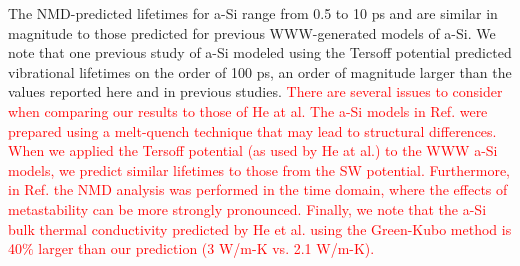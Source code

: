 \documentclass[aps,prb,twocolumn,superscriptaddress,footinbib,amsmath,amssymb,floatfix]{revtex4}
\begin{document}
The NMD-predicted lifetimes for a-Si range from 0.5 to 10 ps 
and are similar in magnitude to 
those predicted for previous WWW-generated models of a-Si.
\cite{fabian_anharmonic_1996,bickham_calculation_1998,
bickham_numerical_1999,fabian_numerical_2003}  
We note that one previous study of a-Si modeled using the 
Tersoff potential predicted vibrational lifetimes on 
the order of 100 ps,\cite{he_heat_2011} an order of magnitude larger 
than the values reported here and in previous studies.
\cite{fabian_anharmonic_1996,bickham_calculation_1998,
bickham_numerical_1999,fabian_numerical_2003} 
\textcolor{red}{
There are several issues to consider when comparing our 
results to those of He at al.\cite{he_heat_2011} The a-Si 
models in Ref.  were prepared using 
a melt-quench technique that may lead to structural 
differences. When we applied the Tersoff potential (as 
used by He at al.) to the WWW a-Si models, 
we predict similar lifetimes to those from the SW potential. 
Furthermore, in Ref.  
the NMD analysis was performed in the time domain, where 
the effects of metastability can be more strongly pronounced. 
Finally, we note that the a-Si bulk thermal conductivity 
predicted by He et al. using the Green-Kubo method is 
40$\%$ larger than our prediction (3 W/m-K vs. 2.1 W/m-K).
}
\end{document}
